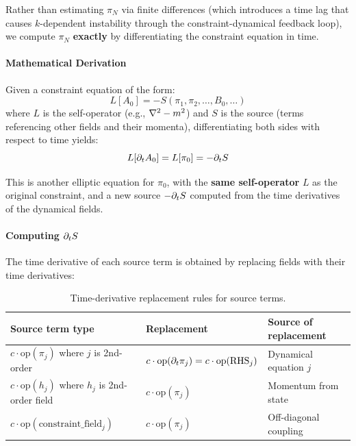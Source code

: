 Rather than estimating $\pi_N$ via finite differences (which introduces a time
lag that causes $k$-dependent instability through the constraint-dynamical
feedback loop), we compute $\pi_N$ \textbf{exactly} by differentiating the constraint
equation in time.

\paragraph{Mathematical Derivation}
\label{sec:cf-math-derivation}

Given a constraint equation of the form:
\begin{equation}
  L[A_0] = -S(\pi_1, \pi_2, \ldots, B_0, \ldots)
  \label{eq:cf-constraint-form}
\end{equation}
where $L$ is the self-operator (e.g., $\nabla^2 - m^2$) and $S$ is the source
(terms referencing other fields and their momenta), differentiating both sides
with respect to time yields:
\begin{equation}
  L[\partial_t A_0] = L[\pi_0] = -\partial_t S
  \label{eq:cf-differentiated}
\end{equation}

This is another elliptic equation for $\pi_0$, with the \textbf{same self-operator}
$L$ as the original constraint, and a new source $-\partial_t S$ computed from the
time derivatives of the dynamical fields.

\paragraph{Computing $\partial_t S$}
\label{sec:cf-dtS}

The time derivative of each source term is obtained by replacing fields with
their time derivatives:

\begin{table}[htbp]
\centering
\caption{Time-derivative replacement rules for source terms.}
\label{tab:cf-replacements}
\begin{tabular}{@{}lll@{}}
\toprule
Source term type & Replacement & Source of replacement \\
\midrule
$c \cdot \mathrm{op}(\pi_j)$ where $j$ is 2nd-order & $c \cdot \mathrm{op}(\partial_t \pi_j) = c \cdot \mathrm{op}(\mathrm{RHS}_j)$ & Dynamical equation $j$ \\
$c \cdot \mathrm{op}(h_j)$ where $h_j$ is 2nd-order field & $c \cdot \mathrm{op}(\pi_j)$ & Momentum from state \\
$c \cdot \mathrm{op}(\text{constraint\_field}_j)$ & $c \cdot \mathrm{op}(\pi_j)$ & Off-diagonal coupling \\
\bottomrule
\end{tabular}
\end{table}

